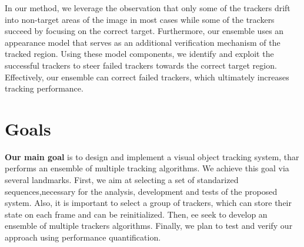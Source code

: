 \iffalse
Taking this into account, we consider an approach that combining the
virtues of different algorithms, while evading their weaknesses, could
outperform each single algorithm. Just as "two heads are better than one",
making trackers perform this task together in an unknown scenario, may
result in a higher level of performance and achievement, than could be
obtained individually. This is what in psychology states as "positive
interdependence", the ability of group members to encourage and
facilitate each other's efforts \cite{Johnson1998}.
\fi

In our method, we leverage the observation that only some of the trackers
drift into non-target areas of the image in most cases while some of the
trackers succeed by focusing on the correct target.
Furthermore, our ensemble uses an appearance model
that serves as an additional verification mechanism of the tracked region.
Using these model components, we identify and exploit the successful trackers
to steer failed trackers towards the correct target region. Effectively,
our ensemble can correct failed trackers, which ultimately increases
tracking performance.

\section{Goals} \label{sec::goals}

\textbf{Our main goal} is to design and implement a visual object tracking
system, thar performs an ensemble of multiple tracking algorithms. We achieve
this goal via several landmarks. First, we
aim at selecting a set of standarized sequences,necessary for the analysis,
development and tests of the proposed system. Also, it is important to
select a group of trackers, which can store their state on each frame and can
be reinitialized. Then, ee seek to develop an ensemble of multiple trackers
algorithms. Finally, we plan to test and verify our approach using performance
quantification. 

